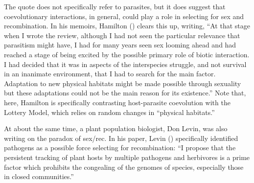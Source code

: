 \documentclass[
  letterpaper,
]{book}
\begin{document}
The quote does not specifically refer to parasites, but it does suggest
that coevolutionary interactions, in general, could play a role in
selecting for sex and recombination. In his memoirs, Hamilton
() clears this up, writing, ``At that
stage when I wrote the review, although I had not seen the particular
relevance that parasitism might have, I had for many years seen sex
looming ahead and had reached a stage of being excited by the possible
primary role of biotic interaction. I had decided that it was in aspects
of the interspecies struggle, and not survival in an inanimate
environment, that I had to search for the main factor. Adaptation to new
physical habitats might be made possible through sexuality but these
adaptations could not be the main reason for its existence.'' Note that,
here, Hamilton is specifically contrasting host-parasite coevolution
with the Lottery Model, which relies on random changes in ``physical
habitats.''

At about the same time, a plant population biologist, Don Levin, was
also writing on the paradox of sex/rec. In his paper, Levin
() specifically identified pathogens as a
possible force selecting for recombination: ``I propose that the
persistent tracking of plant hosts by multiple pathogens and herbivores
is a prime factor which prohibits the congealing of the genomes of
species, especially those in closed communities.''
\end{document}
